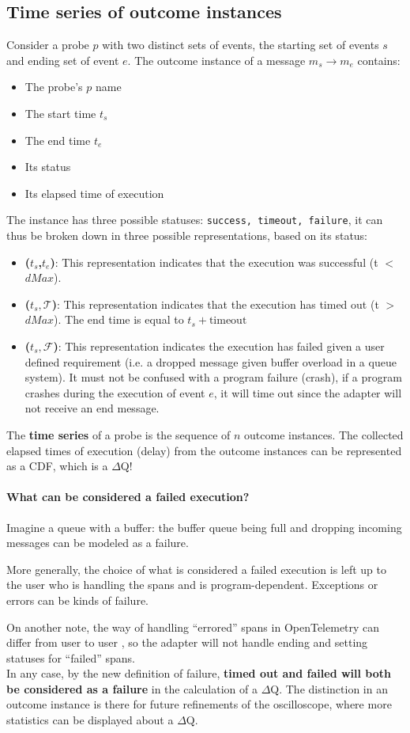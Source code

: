 \subsection{Time series of outcome instances}
    Consider a probe $p$ with two distinct sets of events, the starting set of events $s$ and ending set of event $e$. The outcome instance of a message $m_s \rightarrow m_e$ contains:
    \begin{itemize}
        \item The probe's $p$ name
        \item The start time $t_s$
        \item The end time $t_e$
        \item Its status 
        \item Its elapsed time of execution
    \end{itemize}
    The instance has three possible statuses: \texttt{success, timeout, failure}, it can thus be broken down in three possible representations, based on its status:
    \begin{itemize}
        \item \textbf{($t_s$,$t_e$)}: This representation indicates that the execution was successful (t $<$ $dMax$). 
        \item \textbf{($t_s, \mathcal{T}$)}: This representation indicates that the execution has timed out (t $>$ $dMax$). The end time is equal to $t_s + \text{timeout}$ 
        \item \textbf{($t_s, \mathcal{F}$)}: This representation indicates the execution has failed given a user defined requirement (i.e. a dropped message given buffer overload in a queue system). It must not be confused with a program failure (crash), if a program crashes during the execution of event $e$, it will time out since the adapter will not receive an end message.
    \end{itemize}
    The \textbf{time series} of a probe is the sequence of $n$ outcome instances. The collected elapsed times of execution (delay) from the outcome instances can be represented as a CDF, which is a $\Delta$Q!

    \paragraph{What can be considered a failed execution?} Imagine a queue with a buffer: the buffer queue being full and dropping incoming messages can be modeled as a failure.

    More generally, the choice of what is considered a failed execution is left up to the user who is handling the spans and is program-dependent. Exceptions or errors can be kinds of failure. 

    On another note, the way of handling ``errored'' spans in OpenTelemetry can differ from user to user  \cite{otel-err}, so the adapter will not handle ending and setting statuses for ``failed'' spans. \\
   In any case, by the new definition of failure, \textbf{timed out and failed will both be considered as a failure} in the calculation of a $\Delta$Q. The distinction in an outcome instance is there for future refinements of the oscilloscope, where more statistics can be displayed about a $\Delta$Q.
